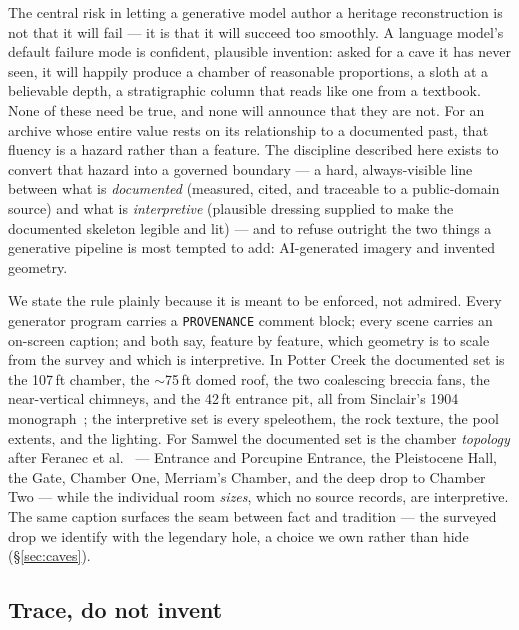 \documentclass[11pt]{article}
\begin{document}
The central risk in letting a generative model author a heritage reconstruction is not that it will fail --- it is that it will succeed too smoothly. A language model's default failure mode is confident, plausible invention: asked for a cave it has never seen, it will happily produce a chamber of reasonable proportions, a sloth at a believable depth, a stratigraphic column that reads like one from a textbook. None of these need be true, and none will announce that they are not. For an archive whose entire value rests on its relationship to a documented past, that fluency is a hazard rather than a feature. The discipline described here exists to convert that hazard into a governed boundary --- a hard, always-visible line between what is \emph{documented} (measured, cited, and traceable to a public-domain source) and what is \emph{interpretive} (plausible dressing supplied to make the documented skeleton legible and lit) --- and to refuse outright the two things a generative pipeline is most tempted to add: AI-generated imagery and invented geometry.

We state the rule plainly because it is meant to be enforced, not admired. Every generator program carries a \texttt{PROVENANCE} comment block; every scene carries an on-screen caption; and both say, feature by feature, which geometry is to scale from the survey and which is interpretive. In Potter Creek the documented set is the 107\,ft chamber, the $\sim$75\,ft domed roof, the two coalescing breccia fans, the near-vertical chimneys, and the 42\,ft entrance pit, all from Sinclair's 1904 monograph~\cite{sinclair04}; the interpretive set is every speleothem, the rock texture, the pool extents, and the lighting. For Samwel the documented set is the chamber \emph{topology} after Feranec et al.~\cite{feranec07} --- Entrance and Porcupine Entrance, the Pleistocene Hall, the Gate, Chamber One, Merriam's Chamber, and the deep drop to Chamber Two --- while the individual room \emph{sizes}, which no source records, are interpretive. The same caption surfaces the seam between fact and tradition --- the surveyed drop we identify with the legendary hole, a choice we own rather than hide (\S\ref{sec:caves}).

\subsection{Trace, do not invent}
\end{document}
